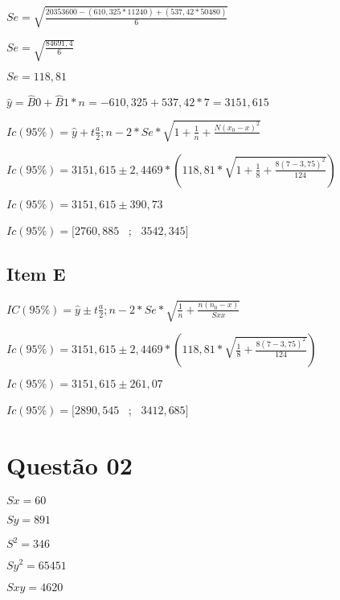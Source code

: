 \documentclass{article}
\begin{document}
    \begin{flushleft}
        $Se = \sqrt{ \frac{20353600 - (610,325 * 11240)+ (537,42 * 50480) }{6}}$

        $Se = \sqrt{ \frac{84691,4 }{6}}$

        $Se = 118,81$
    \end{flushleft}   

    \begin{flushleft}
        $\hat{y} = \hat{B}0 + \hat{B}1 *n = -610,325 + 537,42 * 7=3151,615$
    \end{flushleft}   

    \begin{flushleft}
        $Ic(95\%) = \hat{y} + t\frac{a}{2};n-2 *Se* \sqrt{1 + \frac{1}{n} +\frac{N(x_0 -x)^2}{}}$

        $Ic(95\%) = 3151,615 \pm 2,4469 *  (118,81* \sqrt{1 + \frac{1}{8} + \frac{8(7-3,75)^2}{124}})$
        
        $Ic(95\%) =  3151,615 \pm 390,73$

        $Ic(95\%) = [2760,885$ \ ; \ $3542,345]$
    \end{flushleft}


    \subsection{Item E}

    \begin{flushleft}
        $IC(95\%) = \hat{y} \pm  t \frac{a}{2}; n-2 *Se * \sqrt{\frac{1}{n} + \frac{n(n_0 - x)}{Sxx}}$ 
        
        $Ic(95\%) = 3151,615 \pm 2,4469 *  (118,81* \sqrt{\frac{1}{8} + \frac{8(7-3,75)^2}{124}})$
        
        $Ic(95\%) =  3151,615 \pm 261,07$

        $Ic(95\%) = [2890,545$ \ ; \ $3412,685]$


    \end{flushleft}


\section{Questão 02}   
        \begin{flushleft}
            
            $Sx = 60$ 	

            $Sy = 891$
            
            $S^2 = 346$
            
            $Sy^2 = 65451$
            
            $Sxy = 4620$
        \end{flushleft}
\end{document}
